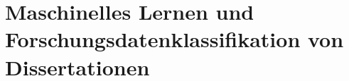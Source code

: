 \chapter{Maschinelles Lernen und Forschungsdatenklassifikation von Dissertationen}\label{ch:machine-learning}
